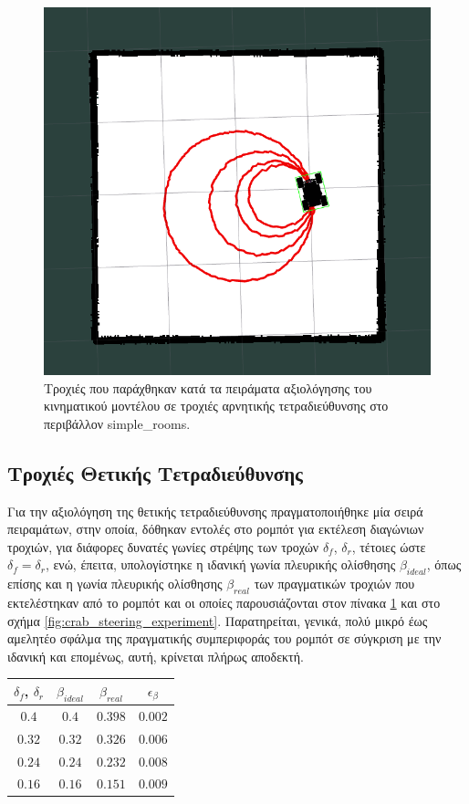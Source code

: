 \begin{figure}[!ht]
	\centering
	\includegraphics[width=0.6\linewidth]{Chapters/Chapter5/Figures/counter_steering_experiment.png}
	\caption{Τροχιές που παράχθηκαν κατά τα πειράματα αξιολόγησης του κινηματικού μοντέλου σε τροχιές αρνητικής τετραδιεύθυνσης στο περιβάλλον simple{\_}rooms.}
	\label{fig:counter_steering_experiment}
\end{figure}


\subsection{Τροχιές Θετικής Τετραδιεύθυνσης}
Για την αξιολόγηση της θετικής τετραδιεύθυνσης πραγματοποιήθηκε μία σειρά πειραμάτων, στην οποία, δόθηκαν εντολές στο ρομπότ για εκτέλεση διαγώνιων τροχιών, για διάφορες δυνατές γωνίες στρέψης των τροχών $\delta_f$, $\delta_r$, τέτοιες ώστε $\delta_f = \delta_r$, ενώ, έπειτα, υπολογίστηκε η ιδανική γωνία πλευρικής ολίσθησης $\beta_{ideal}$, όπως επίσης και η γωνία πλευρικής ολίσθησης $\beta_{real}$ των πραγματικών τροχιών που εκτελέστηκαν από το ρομπότ και οι οποίες παρουσιάζονται στον πίνακα \ref{tab:crab_steering_experiment} και στο σχήμα \ref{fig:crab_steering_experiment}. Παρατηρείται, γενικά, πολύ μικρό έως αμελητέο σφάλμα της πραγματικής συμπεριφοράς του ρομπότ σε σύγκριση με την ιδανική και επομένως, αυτή, κρίνεται πλήρως αποδεκτή.

\bigskip 
\begin{table}[!ht]
	\centering
	\label{tab:crab_steering_experiment}
	\begin{tabular}{c | c |  c | c}
	 	\textbf{$\delta_f$, $\delta_r$} & \textbf{$\beta_{ideal}$} & \textbf{$\beta_{real}$} & \textbf{${\epsilon}_{\beta}$} \\ \hline
	   $0.4$ & $0.4$ & $0.398$ & $0.002$\\
 	   $0.32$ & $0.32$ & $0.326$ & $0.006$\\
  	   $0.24$ & $0.24$ & $0.232$ & $0.008$\\
   	   $0.16$ & $0.16$ & $0.151$ & $0.009$\\
   	\end{tabular}
\end{table}

